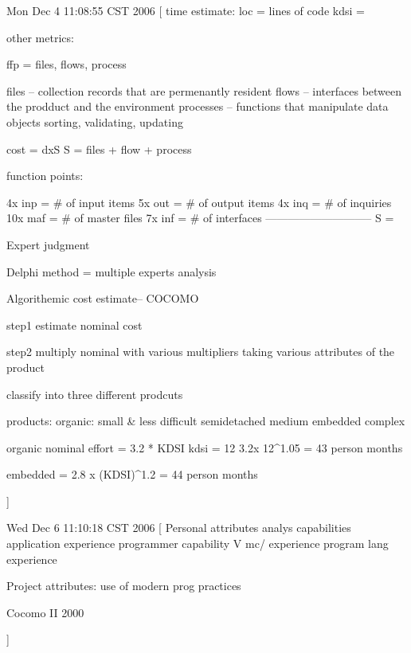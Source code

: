 \documentclass[a4paper]{article}
\begin{document}
{
Mon Dec  4 11:08:55 CST 2006
[
time estimate:
	loc = lines of code
	kdsi = 

	other metrics:

		ffp = files, flows, process

		files -- collection records that are permenantly resident
		flows -- interfaces between the prodduct and the environment
		processes -- functions that manipulate data objects sorting, validating, updating

		cost = dxS
		S = files + flow + process


		function points:

			4x inp = # of input items
			5x out = # of output items
			4x inq = # of inquiries
			10x maf = # of master files
			7x inf = # of interfaces
			-----------------------------
			S = 

		Expert judgment

		Delphi method = multiple experts analysis

		Algorithemic cost estimate--  COCOMO

		step1
			estimate nominal cost

		step2
			multiply nominal with various multipliers taking various attributes of the product

		classify into three different prodcuts

		products:
				organic:		small & less difficult
				semidetached		medium
				embedded		complex

		organic
			nominal effort = 3.2 * KDSI
				kdsi = 12
					3.2x 12^1.05 = 43 person months

			embedded = 2.8 x (KDSI)^1.2 = 44 person months


			





]


Wed Dec  6 11:10:18 CST 2006
[
  Personal attributes
  	analys capabilities
	application experience
	programmer capability
	V mc/ experience
	program lang experience

 Project attributes:
 	use of modern prog practices

	Cocomo II   2000



]
}
\end{document}
